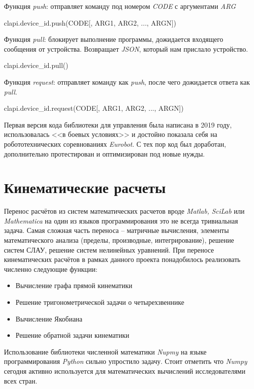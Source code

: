 \noindent Функция \textit{push}: отправляет команду под номером \textit{CODE} с аргументами \textit{ARG}
\begin{code}
    clapi.device_id.push(CODE[, ARG1, ARG2, ..., ARGN])
\end{code}

\noindent Функция \textit{pull}: блокирует выполнение программы, дожидается входящего сообщения от устройства. Возвращает \textit{JSON}, который нам прислало устройство.
\begin{code}
    clapi.device_id.pull()
\end{code}

\noindent Функция \textit{request}: отправляет команду как \textit{push}, после чего дожидается ответа как \textit{pull}.
\begin{code}
    clapi.device_id.request(CODE[, ARG1, ARG2, ..., ARGN])
\end{code}

Первая версия кода библиотеки для управления была написана в 2019 году, использовалась <<в боевых условиях>> и достойно показала себя на робототехнических соревнованиях \textit{Eurobot}. С тех пор код был доработан, дополнительно протестирован и оптимизирован под новые нужды.

\section{Кинематические расчеты}

Перенос расчётов из систем математических расчетов вроде \textit{Matlab, SciLab} или \textit{Mathematica} на один из языков программирования это не всегда тривиальная задача. Самая сложная часть переноса -- матричные вычисления, элементы математического анализа (пределы, производные, интегрирование), решение систем СЛАУ, решение систем нелинейных уравнений. При переносе кинематических расчётов в рамках данного проекта понадобилось реализовать численно следующие функции:
\begin{itemize}
    \item Вычисление графа прямой кинематики
    \item Решение тригонометрической задачи о четырехзвеннике
    \item Вычисление Якобиана
    \item Решение обратной задачи кинематики
\end{itemize}

Использование библиотеки численной математики \textit{Nupmy} на языке программирования \textit{Python} сильно упростило задачу. Стоит отметить что \textit{Numpy} сегодня активно используется для математических вычислений исследователями всех стран.

